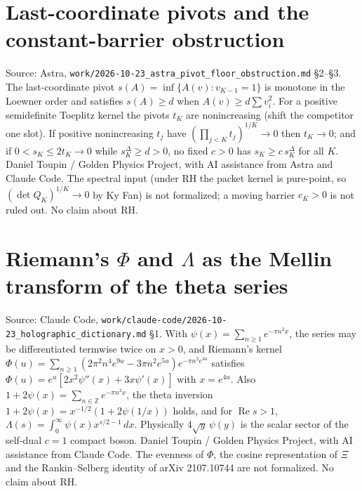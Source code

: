 \documentclass{report}
\theoremstyle{definition}
\begin{document}
\begin{itemize}
\begin{itemize}
\section{Last-coordinate pivots and the constant-barrier obstruction}
Source: Astra, \texttt{work/2026-10-23\_astra\_pivot\_floor\_obstruction.md} \S2--\S3. The last-coordinate pivot $s(A)=\inf\{A(v):v_{K-1}=1\}$ is monotone in the Loewner order
and satisfies $s(A)\ge d$ when $A(v)\ge d\sum v_i^2$. For a positive semidefinite Toeplitz kernel the pivots $t_K$ are nonincreasing (shift the competitor
one slot). If positive nonincreasing $t_j$ have $(\prod_{j<K}t_j)^{1/K}\to0$ then $t_K\to0$; and if $0<s_K\le2t_K\to0$ while $s^\Delta_K\ge d>0$, no fixed
$c>0$ has $s_K\ge c\,s^\Delta_K$ for all $K$. Daniel Toupin / Golden Physics Project, with AI assistance from Astra and Claude Code. The spectral input
(under RH the packet kernel is pure-point, so $(\det Q_K)^{1/K}\to0$ by Ky Fan) is not formalized; a moving barrier $c_K>0$ is not ruled out. No claim about RH.
\section{Riemann's $\Phi$ and $\Lambda$ as the Mellin transform of the theta series}
Source: Claude Code, \texttt{work/claude-code/2026-10-23\_holographic\_dictionary.md} \S1. With $\psi(x)=\sum_{n\ge1}e^{-\pi n^2x}$, the series may be differentiated
termwise twice on $x>0$, and Riemann's kernel $\Phi(u)=\sum_{n\ge1}(2\pi^2n^4e^{9u}-3\pi n^2e^{5u})e^{-\pi n^2e^{4u}}$ satisfies
$\Phi(u)=e^u[2x^2\psi''(x)+3x\psi'(x)]$ with $x=e^{4u}$. Also $1+2\psi(x)=\sum_{n\in\mathbb Z}e^{-\pi n^2x}$, the theta inversion
$1+2\psi(x)=x^{-1/2}(1+2\psi(1/x))$ holds, and for $\operatorname{Re}s>1$, $\Lambda(s)=\int_0^\infty\psi(x)x^{s/2-1}\,dx$. Physically $4\sqrt y\,\psi(y)$ is the
scalar sector of the self-dual $c=1$ compact boson. Daniel Toupin / Golden Physics Project, with AI assistance from Claude Code. The evenness of $\Phi$,
the cosine representation of $\Xi$ and the Rankin--Selberg identity of arXiv 2107.10744 are not formalized. No claim about RH.

\end{itemize}
\end{itemize}
\end{document}
